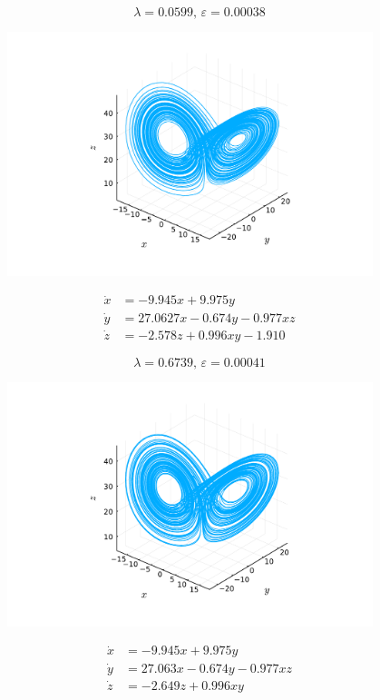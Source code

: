 \documentclass[10pt]{paper}
\begin{document}
\begin{figure}[ptb]
\begin{minipage}{0.47\textwidth}
		\[ \lambda = 0.0599, \, \varepsilon = 0.00038 \]
		\begin{center}
			\includegraphics[width=0.95\textwidth, trim={4.3cm, 1.6cm, 4.3cm, 2.5cm}, clip]{lorenz_lambda_3.pdf}
		\end{center}
		\[ \begin{aligned}
			\dot x &= -9.945x + 9.975y \\ 
			\dot y &= 27.0627x -0.674y  -0.977xz \\ 
			\dot z &=  -2.578z + 0.996xy -1.910
		\end{aligned} \]
	\end{minipage}%
	\begin{minipage}{0.47\textwidth}
		\[ \lambda = 0.6739, \, \varepsilon = 0.00041 \]
		\begin{center}
			\includegraphics[width=0.95\textwidth, trim={4.3cm, 1.6cm, 4.3cm, 2.5cm}, clip]{lorenz_lambda_2.pdf}
		\end{center}
		\[ \begin{aligned}
			\dot x &= -9.945x + 9.975y \\ 
			\dot y &= 27.063x -0.674y  -0.977xz\\ 
			\dot z &= -2.649z + 0.996xy\\ 
		\end{aligned} \]


\end{minipage}
\end{figure}
\end{document}
